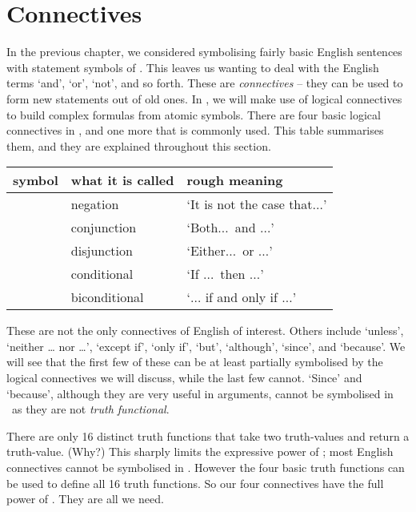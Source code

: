 \documentclass[PHIL101-Textbook.tex]{subfiles}
\begin{document}
\chapter{Connectives}\label{ch:TFLConnectives}

In the previous chapter, we considered symbolising fairly basic English sentences with statement symbols of \tfl. This leaves us wanting to deal with the English terms `and', `or', `not', and so forth. These are \emph{connectives} -- they can be used to form new statements out of old ones. In \tfl, we will make use of logical connectives to build complex formulas from atomic symbols. There are four basic logical connectives in \tfl, and one more that is commonly used. This table summarises them, and they are explained throughout this section.

	\begin{table}[h]
	\center
	\begin{tabular}{l l l}
	
	\textbf{symbol}&\textbf{what it is called}&\textbf{rough meaning}\\
	\hline
	\enot &negation&`It is not the case that$\ldots$'\\
	\eand &conjunction&`Both$\ldots$\ and $\ldots$'\\
	\eor &disjunction&`Either$\ldots$\ or $\ldots$'\\
	\eif &conditional&`If $\ldots$\ then $\ldots$'\\
	\hline
	\eiff &biconditional&`$\ldots$ if and only if $\ldots$'\\
	\hline
	\end{tabular}
	\end{table}

These are not the only connectives of English of interest. Others include `unless', `neither \dots{} nor \dots', `except if', `only if', `but', `although', `since', and `because'. We will see that the first few of these can be at least partially symbolised by the logical connectives we will discuss, while the last few cannot. `Since' and `because', although they are very useful in arguments, cannot be symbolised in \tfl\ as they are not \emph{truth functional}.

There are only 16 distinct truth functions that take two truth-values and return a truth-value. (Why?) This sharply limits the expressive power of \tfl; most English connectives cannot be symbolised in \tfl. However the four basic truth functions can be used to define all 16 truth functions. So our four connectives have the full power of \tfl. They are all we need.
\end{document}
